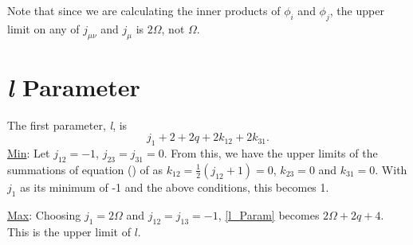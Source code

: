 \documentclass[Dissertation.tex]{subfiles}
\begin{document}
Note that since we are calculating the inner products of $\phi_i$ and $\phi_j$, the upper limit on any of $j_{\mu \nu}$ and $j_{\mu}$ is $2\Omega$, not $\Omega$.

\section{\emph{l} Parameter}
The first parameter, \emph{l}, is
\begin{equation}
	\label{l_Param}j_1 + 2 + 2q + 2 k_{12} + 2 k_{31}.
\end{equation}
\underline{Min}: Let $j_{12} = -1$, $j_{23} = j_{31} = 0$.  From this, we have the upper limits of the summations of equation () of \cite{Drake1995} as $k_{12} = \tfrac{1}{2} (j_{12} + 1) = 0$, $k_{23} = 0$ and $k_{31} = 0$. With $j_1$ as its minimum of -1 and the above conditions, this becomes 1.

\noindent\underline{Max}: Choosing $j_1 = 2 \Omega$ and $j_{12} = j_{13} = -1$, \cref{l_Param} becomes $2 \Omega + 2q + 4$.  This is the upper limit of $l$.
\end{document}
